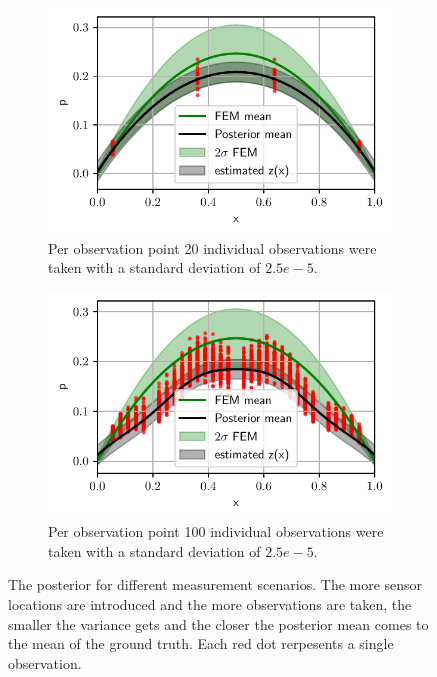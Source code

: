 \documentclass[%
  a4paper,oneside,%
  11pt,%
  smallchapters,
  style=printdev,
  extramargin,
  green,%
  rgb, <cmyk>
  ]{tubsbook}
\begin{document}
\begin{figure}[!ht]
	\begin{subfigure}[t]{.5\textwidth}
	\centering
	\includegraphics[width=1\linewidth]{../../Python/Results/1D/Model_Error/20o_4s/Result.pdf}
	\caption{Per observation point 20 individual observations were taken with a standard deviation of $2.5e-5$. }	
	\label{fig:ModelError1Dc}
	\end{subfigure}%
	\begin{subfigure}[t]{.5\textwidth}
	\centering
	\includegraphics[width=1\linewidth]{../../Python/Results/1D/Model_Error/100o_30s/Result.pdf}
	\caption{Per observation point 100 individual observations were taken with a standard deviation of $2.5e-5$. }	
	\label{fig:ModelError1Dd}
	\end{subfigure}

\caption[The posterior for the 1D example after introducing observations with a model error]{The posterior for different measurement scenarios. The more sensor locations are introduced and the more observations are taken, the smaller the variance gets and the closer the posterior mean comes to the mean of the ground truth. Each red dot rerpesents a single observation.}	
	
\label{fig:ModelError1D}
\end{figure}
\end{document}
